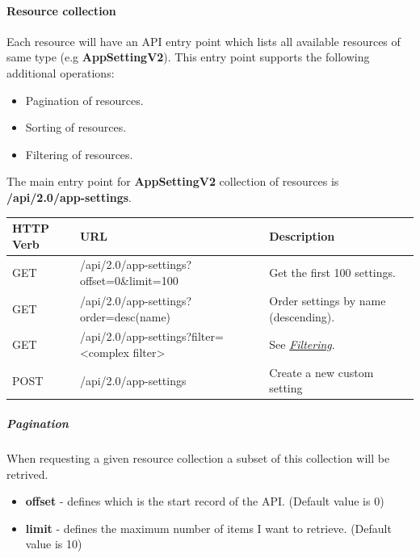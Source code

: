 \documentclass[letterpaper,10pt,english]{sphinxmanual}
\begin{document}
\paragraph{Resource collection}
\label{features/roa/rest_standard:resource-collection}
Each resource will have an API entry point which lists all available resources of same type (e.g \textbf{AppSettingV2}).
This entry point supports the following additional operations:
\begin{itemize}
\item {} 
Pagination of resources.

\item {} 
Sorting of resources.

\item {} 
Filtering of resources.

\end{itemize}

The main entry point for \textbf{AppSettingV2} collection of resources is \textbf{/api/2.0/app-settings}.

\begin{tabulary}{\linewidth}{|L|L|L|}
\hline

\textbf{HTTP Verb}
 & 
\textbf{URL}
 & 
\textbf{Description}
\\\hline

GET
 & 
/api/2.0/app-settings?offset=0\&limit=100
 & 
Get the first 100 settings.
\\\hline

GET
 & 
/api/2.0/app-settings?order=desc(name)
 & 
Order settings by name (descending).
\\\hline

GET
 & 
/api/2.0/app-settings?filter=\textless{}complex filter\textgreater{}
 & 
See {\hyperref[features/roa/rest_standard:roa-filtering]{\emph{Filtering}}}.
\\\hline

POST
 & 
/api/2.0/app-settings
 & 
Create a new custom setting
\\\hline
\end{tabulary}



\subparagraph{Pagination}
\label{features/roa/rest_standard:pagination}
When requesting a given resource collection a subset of this collection will be retrived.
\begin{itemize}
\item {} 
\textbf{offset} - defines which is the start record of the API. (Default value is 0)

\item {} 
\textbf{limit} - defines the maximum number of items I want to retrieve. (Default value is 10)

\end{itemize}
\end{document}
